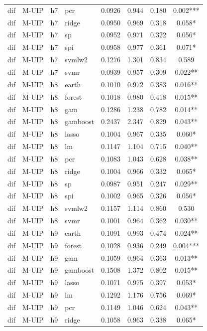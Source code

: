 \begin{ThreePartTable}
\begin{longtable}[t]{llclcccc}
dif & M-UIP & h7 & pcr & 0.0926 & 0.944 & 0.180 & 0.002***\\
dif & M-UIP & h7 & ridge & 0.0950 & 0.969 & 0.318 & 0.058*\\
dif & M-UIP & h7 & sp & 0.0952 & 0.971 & 0.322 & 0.056*\\
dif & M-UIP & h7 & spi & 0.0958 & 0.977 & 0.361 & 0.071*\\
dif & M-UIP & h7 & svmlw2 & 0.1276 & 1.301 & 0.834 & 0.589\\
dif & M-UIP & h7 & svmr & 0.0939 & 0.957 & 0.309 & 0.022**\\
\addlinespace
dif & M-UIP & h8 & earth & 0.1010 & 0.972 & 0.383 & 0.016**\\
dif & M-UIP & h8 & forest & 0.1018 & 0.980 & 0.418 & 0.015**\\
dif & M-UIP & h8 & gam & 0.1286 & 1.238 & 0.782 & 0.014**\\
dif & M-UIP & h8 & gamboost & 0.2437 & 2.347 & 0.829 & 0.043**\\
dif & M-UIP & h8 & lasso & 0.1004 & 0.967 & 0.335 & 0.060*\\
dif & M-UIP & h8 & lm & 0.1147 & 1.104 & 0.715 & 0.040**\\
dif & M-UIP & h8 & pcr & 0.1083 & 1.043 & 0.628 & 0.038**\\
dif & M-UIP & h8 & ridge & 0.1004 & 0.966 & 0.332 & 0.065*\\
dif & M-UIP & h8 & sp & 0.0987 & 0.951 & 0.247 & 0.029**\\
dif & M-UIP & h8 & spi & 0.1002 & 0.965 & 0.326 & 0.056*\\
dif & M-UIP & h8 & svmlw2 & 0.1157 & 1.114 & 0.860 & 0.530\\
dif & M-UIP & h8 & svmr & 0.1001 & 0.964 & 0.362 & 0.030**\\
\addlinespace
dif & M-UIP & h9 & earth & 0.1091 & 0.993 & 0.474 & 0.024**\\
dif & M-UIP & h9 & forest & 0.1028 & 0.936 & 0.249 & 0.004***\\
dif & M-UIP & h9 & gam & 0.1059 & 0.964 & 0.363 & 0.013**\\
dif & M-UIP & h9 & gamboost & 0.1508 & 1.372 & 0.802 & 0.015**\\
dif & M-UIP & h9 & lasso & 0.1071 & 0.975 & 0.397 & 0.053*\\
dif & M-UIP & h9 & lm & 0.1292 & 1.176 & 0.756 & 0.069*\\
dif & M-UIP & h9 & pcr & 0.1149 & 1.046 & 0.624 & 0.043**\\
dif & M-UIP & h9 & ridge & 0.1058 & 0.963 & 0.338 & 0.065*\\

\end{longtable}
\end{ThreePartTable}
